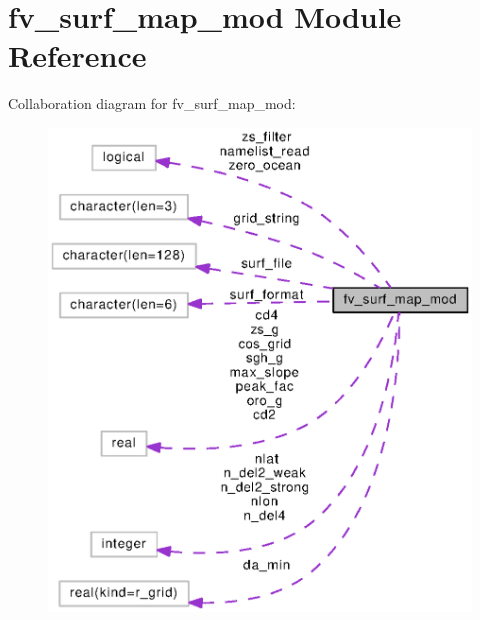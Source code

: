 \section{fv\-\_\-surf\-\_\-map\-\_\-mod Module Reference}
\label{classfv__surf__map__mod}


Collaboration diagram for fv\-\_\-surf\-\_\-map\-\_\-mod\-:
\nopagebreak
\begin{figure}[H]
\begin{center}
\leavevmode
\includegraphics[width=350pt]{classfv__surf__map__mod__coll__graph}
\end{center}
\end{figure}

